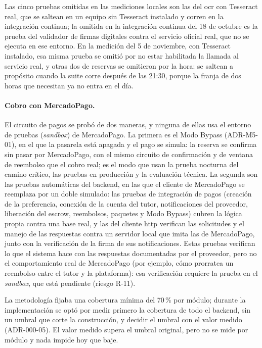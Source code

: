 Las cinco pruebas omitidas en las mediciones locales son las del
\gls{ocr} con Tesseract real, que se saltean en un equipo sin Tesseract
instalado y corren en la integración continua; la omitida en la
integración continua del 18 de octubre es la prueba del validador de
firmas digitales contra el servicio oficial real, que no se ejecuta en
ese entorno. En la medición del 5 de noviembre, con Tesseract instalado,
esa misma prueba se omitió por no estar habilitada la llamada al
servicio real, y otras dos de reservas se omitieron por la hora: se
saltean a propósito cuando la suite corre después de las 21:30, porque
la franja de dos horas que necesitan ya no entra en el día.

\paragraph{Cobro con MercadoPago.} El circuito de pagos se probó de dos
maneras, y ninguna de ellas usa el entorno de pruebas
(\emph{sandbox}) de MercadoPago. La primera es el Modo Bypass
(ADR-M5-01), en el que la pasarela está apagada y el pago se simula: la
reserva se confirma sin pasar por MercadoPago, con el mismo circuito de
confirmación y de ventana de reembolso que el cobro real; es el modo que
usan la prueba nocturna del camino crítico, las pruebas en producción y
la evaluación técnica. La segunda son las pruebas automáticas del
backend, en las que el cliente de MercadoPago se reemplaza por un doble
simulado: las pruebas de integración de pagos (creación de la
preferencia, conexión de la cuenta del tutor, notificaciones del
proveedor, liberación del \gls{escrow}, reembolsos, paquetes y Modo
Bypass) cubren la lógica propia contra una base real, y las del cliente
\gls{http} verifican las solicitudes y el manejo de las respuestas
contra un servidor local que imita las de MercadoPago, junto con la
verificación de la firma de sus notificaciones. Estas pruebas verifican
lo que el sistema hace con las respuestas documentadas por el
proveedor, pero no el comportamiento real de MercadoPago (por ejemplo,
cómo prorratea un reembolso entre el tutor y la plataforma): esa
verificación requiere la prueba en el \emph{sandbox}, que está
pendiente (riesgo R-11).

La metodología fijaba una cobertura mínima del
70\,\% por módulo; durante la implementación se optó por medir primero la
cobertura de todo el backend, sin un umbral que corte la construcción,
y decidir el umbral con el valor medido (ADR-000-05). El valor medido
supera el umbral original, pero no se mide por módulo y nada impide hoy
que baje.

